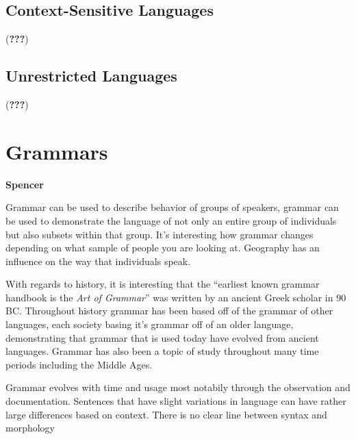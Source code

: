 \documentclass{article}
\begin{document}
\subsection{Context-Sensitive Languages} (\textbf{???})

\subsection{Unrestricted Languages} (\textbf{???})

\section{Grammars}

\textbf{Spencer}

\medskip

Grammar can be used to describe behavior of groups of speakers, grammar can be used to demonstrate the language of not only an
entire group of individuals but also subsets within that group. It's interesting how grammar changes depending on what sample 
of people you are looking at. Geography has an influence on the way that individuals speak.

With regards to history, it is interesting that the ``earliest known grammar handbook is the \textit{Art of Grammar}'' was written
by an ancient Greek scholar in 90 BC. Throughout history grammar has been based off of the grammar of other languages, each society
basing it's grammar off of an older language, demonstrating that grammar that is used today have evolved from ancient languages.
Grammar has also been a topic of study throughout many time periods including the Middle Ages.

Grammar evolves with time and usage most notabily through the observation and documentation. Sentences that have slight variations in
language can have rather large differences based on context. There is no clear line between syntax and morphology
\end{document}
